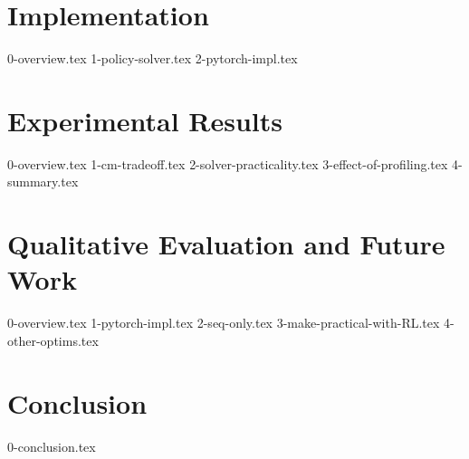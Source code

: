 \documentclass[12pt,twoside]{report}
\begin{document}
\chapter{Implementation}
{0-overview.tex}
{1-policy-solver.tex}
{2-pytorch-impl.tex}

\chapter{Experimental Results} \label{ch:4-experiments}
{0-overview.tex}
{1-cm-tradeoff.tex}
{2-solver-practicality.tex}
{3-effect-of-profiling.tex}
{4-summary.tex}

\chapter{Qualitative Evaluation and Future Work}
{0-overview.tex}
{1-pytorch-impl.tex}
{2-seq-only.tex}
{3-make-practical-with-RL.tex}
{4-other-optims.tex}

\chapter{Conclusion}
{0-conclusion.tex}


\end{document}
